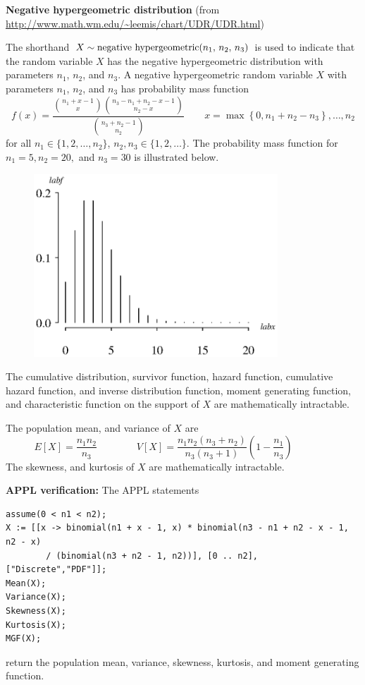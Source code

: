 \documentclass[12pt,fullpage]{article}
\begin{document}
\noindent
{\bf Negative hypergeometric distribution} (from \color{blue}\url{http://www.math.wm.edu/~leemis/chart/UDR/UDR.html}\color{black})

\noindent
The shorthand $X \sim {\rm negative\  hypergeometric}(n_1,\, n_2,\, n_3)$ is used to indicate that the
random variable $X$ has the negative hypergeometric distribution with parameters $n_1$, $n_2$, and $n_3$.
A negative hypergeometric random variable $X$ with parameters $n_1$, $n_2$, and $n_3$ has probability mass function 
$$
f(x) = {\frac {{n_1 + x - 1\choose x} {n_3 - n_1 + n_2 - x - 1\choose n_2 - x}}{{n_3 + n_2 - 1\choose n_2}}}
 \quad \quad x = \max\left\{0, n_1 + n_2 - n_3 \right\}, \ldots, n_2
$$
for all $n_1 \in \{ 1, 2, \ldots, n_2 \}$, $n_2, n_3 \in \{ 1, 2, \ldots \}$. The probability mass function for $n_1 = 5, n_2 = 20,$ and $n_3 = 30$ is illustrated below.
\begin{figure}[h!]
\begin{center}
\includegraphics[width=3.6in]{NegativehypergeometricPlot.ps}
\end{center}
\end{figure}


\noindent
The cumulative distribution, survivor function, hazard function, cumulative hazard 
function, and inverse distribution function, moment generating function, and characteristic function
 on the support of $X$ are mathematically intractable.

 \vspace{0.05in}

\noindent
The population mean, and variance of $X$ are
$$
E[X] = \frac{n_1 n_2} {n_3} \qquad \qquad 
V[X] = \frac{n_1 n_2 (n_3 + n_2)} {n_3(n_3 + 1)} \left(1 - \frac{n_1} {n_3}\right) \qquad \qquad 
$$
The skewness, and kurtosis of $X$ are mathematically intractable.\\

\vspace{0.1in}

\newpage
\noindent
{\bf APPL verification:}
The APPL statements
\begin{verbatim}
assume(0 < n1 < n2);
X := [[x -> binomial(n1 + x - 1, x) * binomial(n3 - n1 + n2 - x - 1, n2 - x)
        / (binomial(n3 + n2 - 1, n2))], [0 .. n2], ["Discrete","PDF"]];
Mean(X);
Variance(X);
Skewness(X);
Kurtosis(X);
MGF(X);
\end{verbatim}
return the population mean, variance, skewness, kurtosis, and moment generating function.
\end{document}
